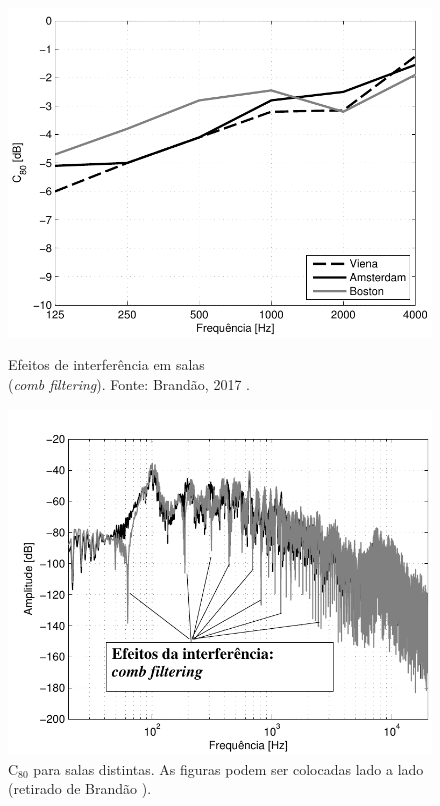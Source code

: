 \documentclass[12pt, a4paper, oneside, onecolumn] {article}%
\begin{document}
\begin{figure}[!ht]
    \centering
    \begin{minipage}[t]{.48\textwidth}
        \centering
        \includegraphics[width=1\linewidth,page=1]{figuras/C80_Concerthalls-Brandao-2017.pdf}
        \caption{Efeitos de interferência em salas\\ (\textit{comb filtering}). Fonte: Brandão, 2017 \cite{Brandao-2017}.
}
        \label{fig:ladoE}
    \end{minipage}%
		\quad
    \begin{minipage}[t]{0.48\textwidth}
        \centering
        \includegraphics[width=1\linewidth,page=1]{figuras/Combfilter-Brandao-2017.pdf}
        \caption{C$_{80}$ para salas distintas. As figuras podem ser colocadas lado a lado (retirado de Brandão \cite{Brandao-2017}).}
        \label{fig:ladoD}
    \end{minipage}
\end{figure}
\end{document}
